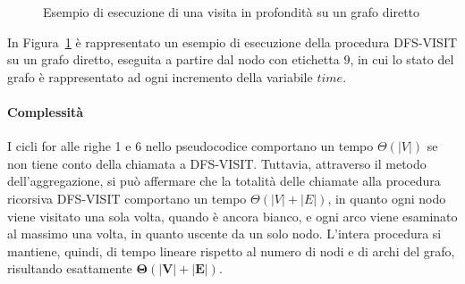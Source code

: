 \begin{figure}
    
    \caption{Esempio di esecuzione di una visita in profondit\`a su un grafo diretto}
    \label{fig:dfs-example}
\end{figure}

In Figura~\ref{fig:dfs-example} \`e rappresentato un esempio di esecuzione della procedura DFS-VISIT su un grafo
diretto, eseguita a partire dal nodo con etichetta $9$, in cui lo stato del grafo \`e rappresentato ad ogni
incremento della variabile $time$.

\paragraph{Complessità}
I cicli for alle righe 1 e 6 nello pseudocodice comportano un tempo $\Theta(|V|)$ se non tiene conto della chiamata a
DFS-VISIT. Tuttavia, attraverso il metodo dell'aggregazione, si può affermare che la totalità delle chiamate alla
procedura ricorsiva DFS-VISIT comportano un tempo $\Theta(|V| + |E|)$, in quanto ogni nodo viene visitato una sola
volta, quando è ancora bianco, e ogni arco viene esaminato al massimo una volta, in quanto uscente da un solo
nodo.
L'intera procedura si mantiene, quindi, di tempo lineare rispetto al numero di nodi e di archi del grafo,
risultando esattamente $\mathbf{\Theta(|V| + |E|)}$.